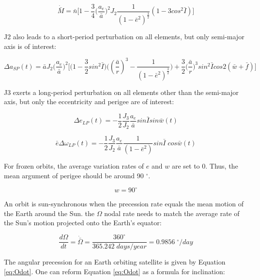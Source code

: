 \documentclass[conf]{new-aiaa}
\begin{document}
\begin{equation}
	\dot{\bar{M}} = \bar{n} \Bigg[ 1 - \frac{3}{4} \big( \frac{a_e}{\bar{a}} \big)^2 J_2 \frac{1}{( 1 - \bar{e}^2 )^{\frac{3}{2}}} (1 - 3 cos^2 \bar{I}) \Bigg]
	\label{eq:Mdot}
\end{equation}

J2 also leads to a short-period perturbation on all elements, but only semi-major axis is of interest: 

\begin{equation}
	\Delta a _{SP} (t) = \bar{a} J_2 \big( \frac{a_e}{\bar{a}} \big)^2 \Bigg[ \Big( 1 - \frac{3}{2} sin^2 \bar{I} \Big) \Big( ( \frac{\bar{a}}{r} )^3 - \frac{1}{( 1 - \bar{e}^2 )^{\frac{3}{2}}} \Big) + \frac{3}{2} \big( \frac{\bar{a}}{r} \big)^3 sin^2 \bar{I} cos 2 (\bar{w} + \bar{f}) \Bigg]
\end{equation}

J3 exerts a long-period perturbation on all elements other than the semi-major axis, but only the eccentricity and perigee are of interest: 

\begin{equation}
	\Delta e_{LP}(t) = - \frac{1}{2} \frac{J_3}{J_2} \frac{a_e}{\bar{a}} sin \bar{I} sin \bar{w} (t) 
	\label{eq:Delta_e_LP}
\end{equation}

\begin{equation}
	\bar{e} \Delta \omega _{LP} (t) = - \frac{1}{2} \frac{J_3}{J_2} \frac{a_e}{\bar{a}} \frac{1}{( 1 - \bar{e}^2 )} sin \bar{I} \; cos \bar{w} (t) 
	\label{eq:Delta_w_LP}
\end{equation}

For frozen orbits, the average variation rates of $e$ and $w$ are set to 0. Thus, the mean argument of perigee should be around 90 $^\circ$. 

\begin{equation}
	w = 90 ^\circ
\end{equation}

An orbit is sun-synchronous when the precession rate equals the mean motion of the Earth around the Sun. the $\Omega$ nodal rate needs to match the average rate of the Sun's motion projected onto the Earth's equator: 

\begin{equation}
	\frac{d \Omega}{dt} = \dot{\bar{\Omega}} = \frac{360 ^\circ}{365.242 \; days/year} = 0.9856 \; ^\circ / day 
\label{eq:SSO_dOmega}
\end{equation}

The angular precession for an Earth orbiting satellite is given by Equation \ref{eq:Odot}. One can reform Equation \ref{eq:Odot} as a formula for inclination: 
\end{document}
